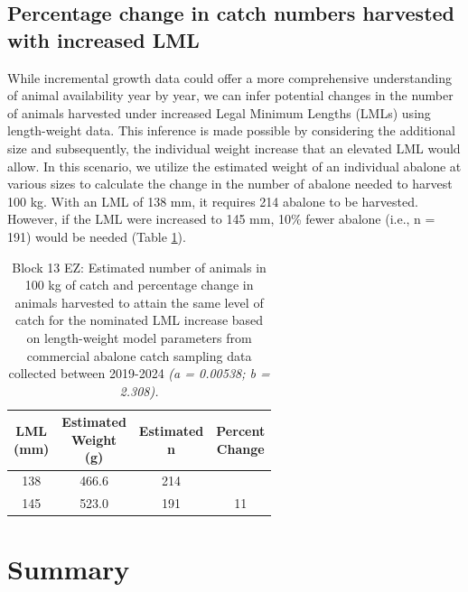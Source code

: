 \documentclass[
]{article}
\begin{document}
\subsection{Percentage change in catch numbers harvested with increased LML}\label{percentage-change-in-catch-numbers-harvested-with-increased-lml}

While incremental growth data could offer a more comprehensive understanding of animal availability year by year, we can infer potential changes in the number of animals harvested under increased Legal Minimum Lengths (LMLs) using length-weight data. This inference is made possible by considering the additional size and subsequently, the individual weight increase that an elevated LML would allow. In this scenario, we utilize the estimated weight of an individual abalone at various sizes to calculate the change in the number of abalone needed to harvest 100 kg. With an LML of 138 mm, it requires 214 abalone to be harvested. However, if the LML were increased to 145 mm, 10\% fewer abalone (i.e., n = 191) would be needed (Table \ref{tab:abcatchweight}).

\begin{table}[!h]
\centering
\caption{\label{tab:abcatchweight}Block 13 EZ: Estimated number of animals in 100 kg of catch and percentage change in animals harvested to attain the same level of catch for the nominated LML increase based on length-weight model parameters from commercial abalone catch sampling data collected between 2019-2024\textit{ (a = 0.00538; b = 2.308).}}
\centering
\begin{tabular}[t]{cccc}
\toprule
\makecell[c]{LML\\(mm)} & \makecell[c]{Estimated\\Weight\\(g)} & \makecell[c]{Estimated\\n} & \makecell[c]{Percent\\Change}\\
\midrule
138 & 466.6 & 214 & \\
145 & 523.0 & 191 & 11\\
\bottomrule
\end{tabular}
\end{table}

\section{Summary}\label{summary}
\end{document}
